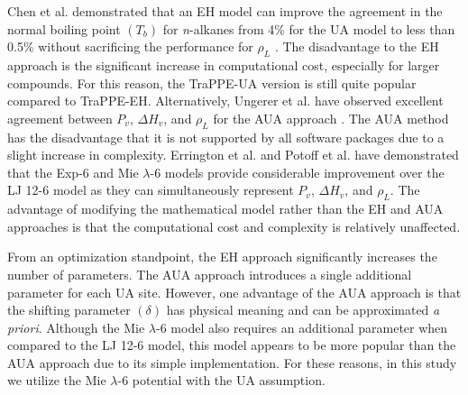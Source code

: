 \documentclass[12pt]{article}
\begin{document}
Chen et al. demonstrated that an EH model can improve the agreement in the normal boiling point $(T_b)$ for \textit{n}-alkanes from 4\% for the UA model \cite{TraPPE} to less than 0.5\% without sacrificing the performance for $\rho_L$ \cite{TraPPE_EH}. The disadvantage to the EH approach is the significant increase in computational cost, especially for larger compounds. For this reason, the TraPPE-UA version is still quite popular compared to TraPPE-EH. Alternatively, Ungerer et al. have observed excellent agreement between $P_v$, $\Delta H_v$, and $\rho_L$ for the AUA approach \cite{AUA3,AUA4}. The AUA method has the disadvantage that it is not supported by all software packages due to a slight increase in complexity. Errington et al. \cite{Exp6} and Potoff et al. \cite{Mie} have demonstrated that the Exp-6 and Mie $\lambda$-6 models provide considerable improvement over the LJ 12-6 model as they can simultaneously represent $P_v$, $\Delta H_v$, and $\rho_L$. The advantage of modifying the mathematical model rather than the EH and AUA approaches is that the computational cost and complexity is relatively unaffected. 

From an optimization standpoint, the EH approach significantly increases the number of parameters. The AUA approach introduces a single additional parameter for each UA site. However, one advantage of the AUA approach is that the shifting parameter $(\delta)$ has physical meaning and can be approximated \textit{a priori}. Although the Mie $\lambda$-6 model also requires an additional parameter when compared to the LJ 12-6 model, this model appears to be more popular than the AUA approach due to its simple implementation. For these reasons, in this study we utilize the Mie $\lambda$-6 potential with the UA assumption.
\end{document}
